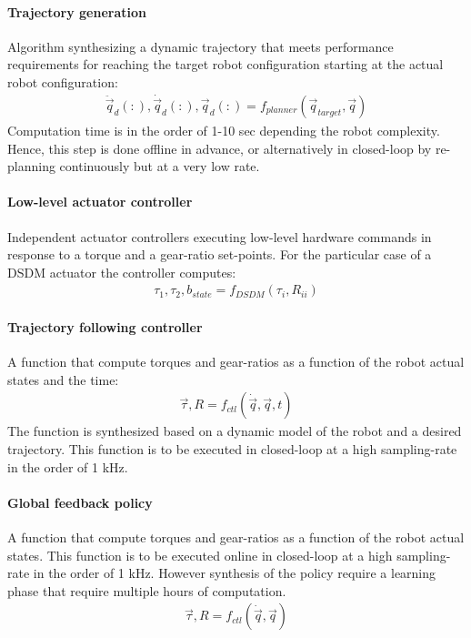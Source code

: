 \paragraph{Trajectory generation} Algorithm synthesizing a dynamic trajectory that meets performance requirements for reaching the target robot configuration starting at the actual robot configuration: 
%
\begin{align}
  \ddot{\vec{q}}_d(:),\dot{\vec{q}}_d(:),\vec{q}_d(:) = f_{planner}(\vec{q}_{target}, \vec{q})
	\label{eq:trajgen}
\end{align}
%
Computation time is in the order of 1-10 sec depending the robot complexity. Hence, this step is done offline in advance, or alternatively in closed-loop by re-planning continuously but at a very low rate. 

\paragraph{Low-level actuator controller} Independent actuator controllers executing low-level hardware commands in response to a torque and a gear-ratio set-points. For the particular case of a DSDM actuator the controller computes:
%
\begin{align}
  \tau_1 , \tau_2 , b_{state} = f_{DSDM}(\tau_i, R_{ii})
	\label{eq:low-level-dsdm}
\end{align}
%

\paragraph{Trajectory following controller} A function that compute torques and gear-ratios as a function of the robot actual states and the time:
%
\begin{align}
  \vec{\tau}, R = f_{ctl}(\dot{\vec{q}}, \vec{q} , t)
	\label{eq:trajctl}
\end{align}
%
 The function is synthesized based on a dynamic model of the robot and a desired trajectory. This function is to be executed in closed-loop at a high sampling-rate in the order of 1 kHz.

\paragraph{Global feedback policy} A function that compute torques and gear-ratios as a function of the robot actual states. This function is to be executed online in closed-loop at a high sampling-rate in the order of 1 kHz. However synthesis of the policy require a learning phase that require multiple hours of computation. 
%
\begin{align}
  \vec{\tau}, R = f_{ctl}(\dot{\vec{q}}, \vec{q})
	\label{eq:globctl}
\end{align}
%


